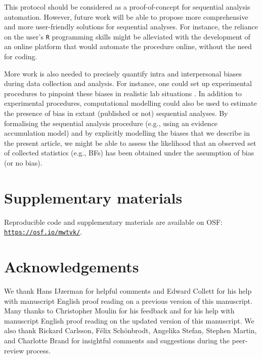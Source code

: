 \documentclass[a4paper,jou,natbib,floatsintext,donotrepeattitle]{apa6}
\begin{document}
This protocol should be considered as a proof-of-concept for sequential analysis automation. However, future work will be able to propose more comprehensive and more user-friendly solutions for sequential analyses. For instance, the reliance on the user's \texttt{R} programming skills might be alleviated with the development of an online platform that would automate the procedure online, without the need for coding.

More work is also needed to precisely quantify intra and interpersonal biases during data collection and analysis. For instance, one could set up experimental procedures to pinpoint these biases in realistic lab situations \citep [e.g., see][]{gilder_role_2018}. In addition to experimental procedures, computational modelling could also be used to estimate the presence of bias in extant (published or not) sequential analyses. By formalising the sequential analysis procedure (e.g., using an evidence accumulation model) and by explicitly modelling the biases that we describe in the present article, we might be able to assess the likelihood that an observed set of collected statistics (e.g., BFs) has been obtained under the assumption of bias (or no bias).

\section{Supplementary materials}\label{sec:supp}

Reproducible code and supplementary materials are available on OSF: \href{https://osf.io/mwtvk}{\nolinkurl{https://osf.io/mwtvk/}}.

\section{Acknowledgements}

We thank Hans IJzerman for helpful comments and Edward Collett for his help with manuscript English proof reading on a previous version of this manuscript. Many thanks to Christopher Moulin for his feedback and for his help with manuscript English proof reading on the updated version of this manuscript. We also thank Rickard Carlsson, Félix Schönbrodt, Angelika Stefan, Stephen Martin, and Charlotte Brand for insightful comments and suggestions during the peer-review process.


\end{document}

